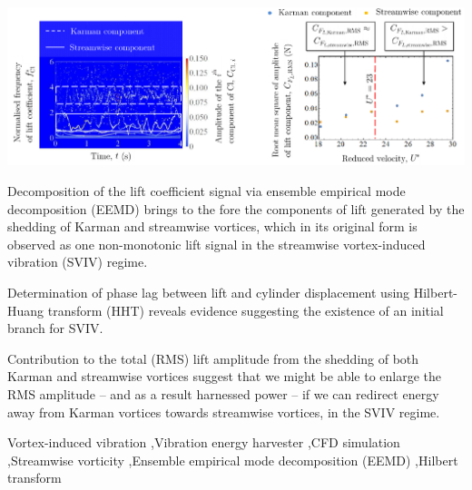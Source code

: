 \documentclass[a4paper,fleqn]{cas-sc}
\begin{document}
\begin{graphicalabstract}
  \includegraphics[width=1\textwidth]{figs/graphicalAbstract}
\end{graphicalabstract}

\begin{highlights}
\item Decomposition of the lift coefficient signal via ensemble empirical mode decomposition (EEMD) brings to the fore the components of lift generated by the shedding of Karman and streamwise vortices, which in its original form is observed as one non-monotonic lift signal in the streamwise vortex-induced vibration (SVIV) regime.
\item Determination of phase lag between lift and cylinder displacement using Hilbert-Huang transform (HHT) reveals evidence suggesting the existence of an initial branch for SVIV.
\item Contribution to the total \rms{} (RMS) lift amplitude from the shedding of both Karman and streamwise vortices suggest that we might be able to enlarge the RMS amplitude -- and as a result harnessed power -- if we can redirect energy away from Karman vortices towards streamwise vortices, in the SVIV regime.
\end{highlights}

\begin{keywords}
  Vortex-induced vibration \sep Vibration energy harvester \sep CFD simulation \sep Streamwise vorticity \sep Ensemble empirical mode decomposition (EEMD) \sep Hilbert transform
\end{keywords}


\maketitle

\doublespacing
\end{document}
